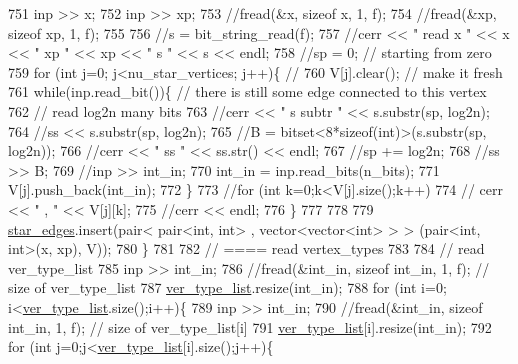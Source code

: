 \begin{DoxyCode}
751     inp >> x;
752     inp >> xp;
753     \textcolor{comment}{//fread(&x, sizeof x, 1, f);}
754     \textcolor{comment}{//fread(&xp, sizeof xp, 1, f);}
755   
756     \textcolor{comment}{//s = bit\_string\_read(f);}
757     \textcolor{comment}{//cerr << " read  x " << x << " xp " << xp << " s " << s << endl;}
758     \textcolor{comment}{//sp = 0; // starting from zero }
759     \textcolor{keywordflow}{for} (\textcolor{keywordtype}{int} j=0; j<nu\_star\_vertices; j++)\{ \textcolor{comment}{// }
760       V[j].clear(); \textcolor{comment}{// make it fresh}
761       \textcolor{keywordflow}{while}(inp.read\_bit())\{ \textcolor{comment}{// there is still some edge connected to this vertex }
762         \textcolor{comment}{// read log2n many bits}
763         \textcolor{comment}{//cerr << " s subtr " << s.substr(sp, log2n);}
764         \textcolor{comment}{//ss << s.substr(sp, log2n);}
765         \textcolor{comment}{//B = bitset<8*sizeof(int)>(s.substr(sp, log2n));}
766         \textcolor{comment}{//cerr << " ss " << ss.str() << endl;}
767         \textcolor{comment}{//sp += log2n;}
768         \textcolor{comment}{//ss >> B;}
769         \textcolor{comment}{//inp >> int\_in;}
770         int\_in = inp.read\_bits(n\_bits);
771         V[j].push\_back(int\_in);
772       \}
773       \textcolor{comment}{//for (int k=0;k<V[j].size();k++)}
774       \textcolor{comment}{//  cerr << " , " << V[j][k];}
775       \textcolor{comment}{//cerr << endl;}
776     \}
777 
778 
779     \hyperlink{classmarked__graph__compressed_a7df5779d313486644132bd816937f532}{star\_edges}.insert(pair< pair<int, int> , vector<vector<int> > > (pair<int, int>(x, xp), V));
780   \}
781 
782   \textcolor{comment}{// ==== read vertex\_types}
783 
784   \textcolor{comment}{// read ver\_type\_list}
785   inp >> int\_in;
786   \textcolor{comment}{//fread(&int\_in, sizeof int\_in, 1, f); // size of ver\_type\_list}
787   \hyperlink{classmarked__graph__compressed_af2e3e55223d436628a02758dfae88493}{ver\_type\_list}.resize(int\_in);
788   \textcolor{keywordflow}{for} (\textcolor{keywordtype}{int} i=0; i<\hyperlink{classmarked__graph__compressed_af2e3e55223d436628a02758dfae88493}{ver\_type\_list}.size();i++)\{
789     inp >> int\_in;
790     \textcolor{comment}{//fread(&int\_in, sizeof int\_in, 1, f); // size of ver\_type\_list[i]}
791     \hyperlink{classmarked__graph__compressed_af2e3e55223d436628a02758dfae88493}{ver\_type\_list}[i].resize(int\_in);
792     \textcolor{keywordflow}{for} (\textcolor{keywordtype}{int} j=0;j<\hyperlink{classmarked__graph__compressed_af2e3e55223d436628a02758dfae88493}{ver\_type\_list}[i].size();j++)\{

\end{DoxyCode}
